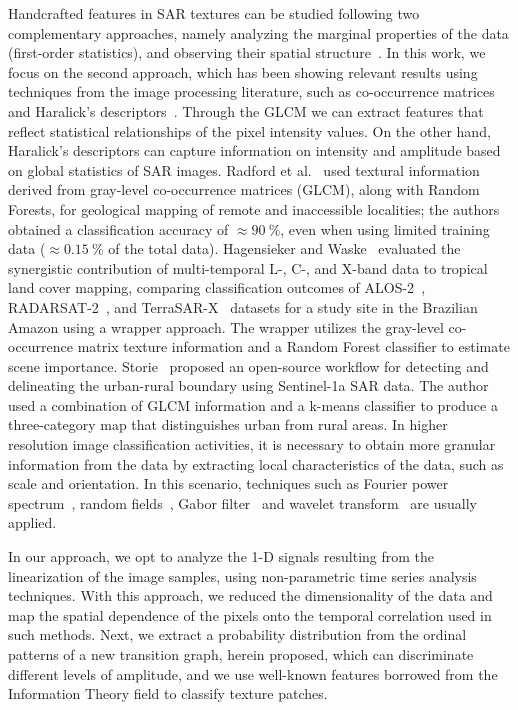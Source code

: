 \documentclass[journal]{IEEEtran}
\begin{document}
Handcrafted features in SAR textures can be studied following two complementary approaches, namely analyzing the marginal properties of the data (first-order statistics), and observing their spatial structure~\cite{Yue2020Gaussian, numbisi2018multi}.
In this work, we focus on the second approach, which has been showing relevant results using techniques from the image processing literature, such as co-occurrence matrices and Haralick's descriptors~\cite{yu2019detection}.
Through the GLCM we can extract features that reflect statistical relationships of the pixel intensity values.
On the other hand, Haralick's descriptors can capture information on intensity and amplitude based on global statistics of SAR images.
Radford et al.~\cite{radford2018geological} used textural information derived from gray-level co-occurrence matrices (GLCM), along with Random Forests, for geological mapping of remote and inaccessible localities; the authors obtained a classification accuracy of $\approx\SI{90}{\percent}$, even when using limited training data ($\approx\SI{0.15}{\percent}$ of the total data). 	
Hagensieker and Waske~\cite{hagensieker2018evaluation} evaluated the synergistic contribution of multi-temporal L-, C-, and X-band data to tropical land cover mapping, comparing classification outcomes of ALOS-2~\cite{kankaku2013alos}, RADARSAT-2~\cite{morena2004introduction}, and TerraSAR-X~\cite{breit2009terrasar} datasets for a study site in the Brazilian Amazon using a wrapper approach. 
The wrapper utilizes the gray-level co-occurrence matrix texture information and a  Random Forest classifier to estimate scene importance. 	
Storie~\cite{storie2018urban} proposed an open-source workflow for detecting and delineating the urban-rural boundary using Sentinel-1a SAR data.
The author used a combination of GLCM information and a k-means classifier to produce a three-category map that distinguishes urban from rural areas. 
In higher resolution image classification activities, it is necessary to obtain more granular information from the data by extracting local characteristics of the data, such as scale and orientation.
In this scenario, techniques such as Fourier power spectrum~\cite{Florindo2012Fractal}, random fields~\cite{zhu2016antarctic}, Gabor filter~\cite{dumitru2014information} and wavelet transform~\cite{akbarizadeh2012new} are usually applied.

In our approach, we opt to analyze the 1-D signals resulting from the linearization of the image samples, using non-parametric time series analysis techniques.
With this approach, we reduced the dimensionality of the data and map the spatial dependence of the pixels onto the temporal correlation used in such methods.
Next, we extract a probability distribution from the ordinal patterns of a new transition graph, herein proposed, which can discriminate different levels of amplitude, and we use well-known features borrowed from the Information Theory field to classify texture patches.
\end{document}
